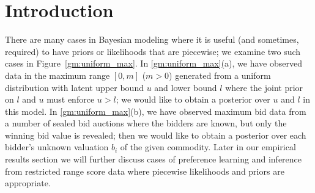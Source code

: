 \documentclass[letterpaper]{article}
\renewcommand{\-}{\text{-}}
\begin{document}
\begin{abstract}
%
%
%
%
\end{abstract}


\section{Introduction}

\label{sec:intro}

There are many cases in Bayesian modeling where it is useful (and
sometimes, required) to have priors or likelihoods that are piecewise;
we examine two such cases in Figure~\ref{gm:uniform_max}.  In
\ref{gm:uniform_max}(a), we have observed data in the maximum range
$[0,m]$ ($m > 0$) generated from a uniform distribution with latent
upper bound $u$ and lower bound $l$ where the joint prior on $l$ and
$u$ must enforce $u > l$; we would like to obtain a posterior over $u$
and $l$ in this model.  In \ref{gm:uniform_max}(b), we have observed
maximum bid data from a number of sealed bid auctions where the
bidders are known, but only the winning bid value is revealed; then we
would like to obtain a posterior over each bidder's unknown valuation
$b_i$ of the given commodity.  Later in our empirical results section
we will further discuss cases of preference learning and inference
from restricted range score data where piecewise likelihoods and
priors are appropriate.
\end{document}
